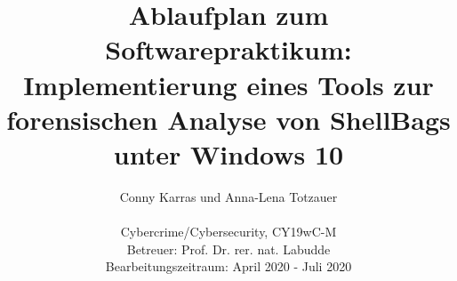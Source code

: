 \documentclass{scrartcl}%
\begin{document}
	\title{Ablaufplan zum Softwarepraktikum: \\ Implementierung eines Tools zur forensischen Analyse von ShellBags unter Windows 10}
	\author{Conny Karras und Anna-Lena Totzauer
		\\
		\\ \small{Cybercrime/Cybersecurity, CY19wC-M}
		\\ \small{Betreuer: Prof. Dr. rer. nat. Labudde}
		\\ \small{Bearbeitungszeitraum: April 2020 - Juli 2020}
		\\ \footnotesize{}}

	\date{}
	\maketitle
	

	

	
	
	
\end{document}
